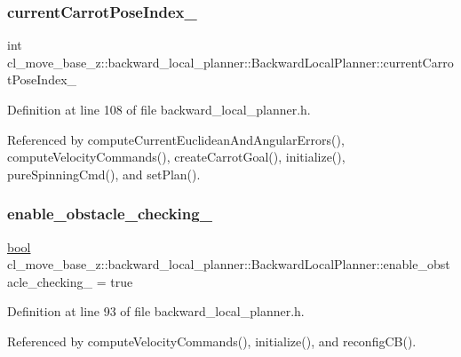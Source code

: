 \subsubsection{\texorpdfstring{current\+Carrot\+Pose\+Index\+\_\+}{currentCarrotPoseIndex\_}}
{\footnotesize\ttfamily int cl\+\_\+move\+\_\+base\+\_\+z\+::backward\+\_\+local\+\_\+planner\+::\+Backward\+Local\+Planner\+::current\+Carrot\+Pose\+Index\+\_\+\hspace{0.3cm}{\ttfamily [private]}}



Definition at line 108 of file backward\+\_\+local\+\_\+planner.\+h.



Referenced by compute\+Current\+Euclidean\+And\+Angular\+Errors(), compute\+Velocity\+Commands(), create\+Carrot\+Goal(), initialize(), pure\+Spinning\+Cmd(), and set\+Plan().

\mbox{\label{classcl__move__base__z_1_1backward__local__planner_1_1BackwardLocalPlanner_a154043366660cc02ec758dda32817511}} 
\subsubsection{\texorpdfstring{enable\+\_\+obstacle\+\_\+checking\+\_\+}{enable\_obstacle\_checking\_}}
{\footnotesize\ttfamily \hyperlink{classbool}{bool} cl\+\_\+move\+\_\+base\+\_\+z\+::backward\+\_\+local\+\_\+planner\+::\+Backward\+Local\+Planner\+::enable\+\_\+obstacle\+\_\+checking\+\_\+ = true\hspace{0.3cm}{\ttfamily [private]}}



Definition at line 93 of file backward\+\_\+local\+\_\+planner.\+h.



Referenced by compute\+Velocity\+Commands(), initialize(), and reconfig\+C\+B().

